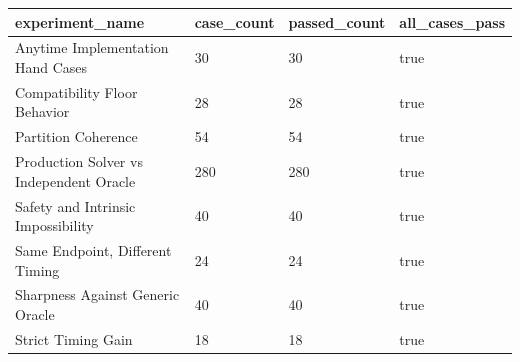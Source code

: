 \begin{tabular}{llll}
\toprule
experiment\_name & case\_count & passed\_count & all\_cases\_pass \\
\midrule
Anytime Implementation Hand Cases & 30 & 30 & true \\
Compatibility Floor Behavior & 28 & 28 & true \\
Partition Coherence & 54 & 54 & true \\
Production Solver vs Independent Oracle & 280 & 280 & true \\
Safety and Intrinsic Impossibility & 40 & 40 & true \\
Same Endpoint, Different Timing & 24 & 24 & true \\
Sharpness Against Generic Oracle & 40 & 40 & true \\
Strict Timing Gain & 18 & 18 & true \\
\bottomrule
\end{tabular}

